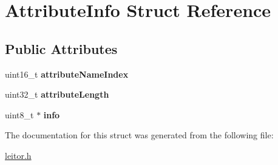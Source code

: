 \hypertarget{structAttributeInfo}{}\section{Attribute\+Info Struct Reference}
\label{structAttributeInfo}
\subsection*{Public Attributes}
\begin{DoxyCompactItemize}
\item 
\mbox{\label{structAttributeInfo_ac0d9d9ffa3214f362c4e06df78036d6e}} 
uint16\+\_\+t {\bfseries attribute\+Name\+Index}
\item 
\mbox{\label{structAttributeInfo_a1755dec7721e0e62a53c698831ba514d}} 
uint32\+\_\+t {\bfseries attribute\+Length}
\item 
\mbox{\label{structAttributeInfo_a29031abd0ae7fd3a55950616e5368dd2}} 
uint8\+\_\+t $\ast$ {\bfseries info}
\end{DoxyCompactItemize}


The documentation for this struct was generated from the following file\+:\begin{DoxyCompactItemize}
\item 
\mbox{\hyperlink{leitor_8h}{leitor.\+h}}\end{DoxyCompactItemize}
